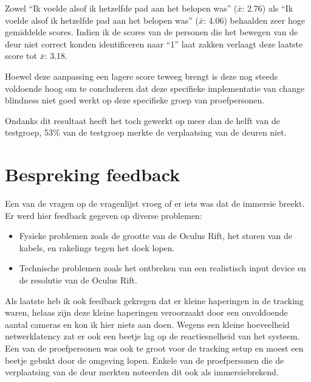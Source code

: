 Zowel ``Ik voelde alsof ik hetzelfde pad aan het belopen was'' ($\bar{x}$: 2.76)
als ``Ik voelde alsof ik hetzelfde pad aan het belopen was'' ($\bar{x}$: 4.06)
behaalden zeer hoge gemiddelde scores. Indien ik de scores van de personen die
het bewegen van de deur niet correct konden identificeren naar ``1'' laat zakken
verlaagt deze laatste score tot $\bar{x}$: 3.18.

Hoewel deze aanpassing een lagere score teweeg brengt is deze nog steeds
voldoende hoog om te concluderen dat deze specifieke implementatie van
change blindness niet goed werkt op deze specifieke groep van proefpersonen.

Ondanks dit resultaat heeft het toch gewerkt op meer dan de helft van de
testgroep, 53\% van de testgroep merkte de verplaatsing van de deuren niet.


\section{Bespreking feedback}
Een van de vragen op de vragenlijst vroeg of er iets was dat de immersie breekt.
Er werd hier feedback gegeven op diverse problemen:

\begin{itemize}
  \item Fysieke problemen zoals de grootte van de Oculus Rift, het storen van de
        kabels, en rakelings tegen het doek lopen.
  \item Technische problemen zoals het ontbreken van een realistisch input device
        en de resolutie van de Oculus Rift.
\end{itemize}

Als laatste heb ik ook feedback gekregen dat er kleine haperingen in de tracking
waren, helaas zijn deze kleine haperingen veroorzaakt door een onvoldoende aantal
cameras en kon ik hier niets aan doen. Wegens een kleine hoeveelheid 
netwerklatency zat er ook een beetje lag op de reactiesnelheid van het systeem. 
Een van de proefpersonen was ook te groot voor de tracking setup en moest een
beetje gebukt door de omgeving lopen. Enkele van de proefpersonen die de 
verplaatsing van de deur merkten noteerden dit ook als immersiebrekend.